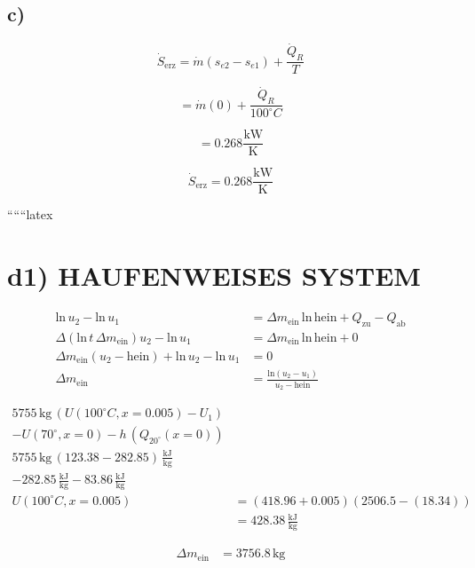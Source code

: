 

\subsection*{c)}

\[
\dot{S}_{\text{erz}} = \dot{m} (s_{e2} - s_{e1}) + \frac{\dot{Q}_R}{T}
\]

\[
= \dot{m} (0) + \frac{\dot{Q}_R}{100^\circ C}
\]

\[
= 0.268 \frac{\text{kW}}{\text{K}}
\]


\[
\dot{S}_{\text{erz}} = 0.268 \frac{\text{kW}}{\text{K}}
\]

``````latex


\section*{d1) HAUFENWEISES SYSTEM}

\begin{align*}
    \text{ln} \, u_2 - \text{ln} \, u_1 &= \Delta m_{\text{ein}} \, \text{ln} \, \text{hein} + Q_{\text{zu}} - Q_{\text{ab}} \\
    \Delta (\text{ln} \, t \, \Delta m_{\text{ein}}) u_2 - \text{ln} \, u_1 &= \Delta m_{\text{ein}} \, \text{ln} \, \text{hein} + 0 \\
    \Delta m_{\text{ein}} (u_2 - \text{hein}) + \text{ln} \, u_2 - \text{ln} \, u_1 &= 0 \\
    \Delta m_{\text{ein}} &= \frac{\text{ln} (u_2 - u_1)}{u_2 - \text{hein}}
\end{align*}

\begin{align*}
    5755 \, \text{kg} \, (U(100^\circ C, x=0.005) - U_1) & \\
    - U(70^\circ, x=0) - h \, (Q_{20^\circ} (x=0)) & \\
    5755 \, \text{kg} \, (123.38 - 282.85) \, \frac{\text{kJ}}{\text{kg}} & \\
    - 282.85 \, \frac{\text{kJ}}{\text{kg}} - 83.86 \, \frac{\text{kJ}}{\text{kg}} & \\
    U(100^\circ C, x=0.005) &= (418.96 + 0.005) (2506.5 - (18.34)) \\
    &= 428.38 \, \frac{\text{kJ}}{\text{kg}}
\end{align*}

\begin{align*}
    \Delta m_{\text{ein}} &= 3756.8 \, \text{kg}
\end{align*}